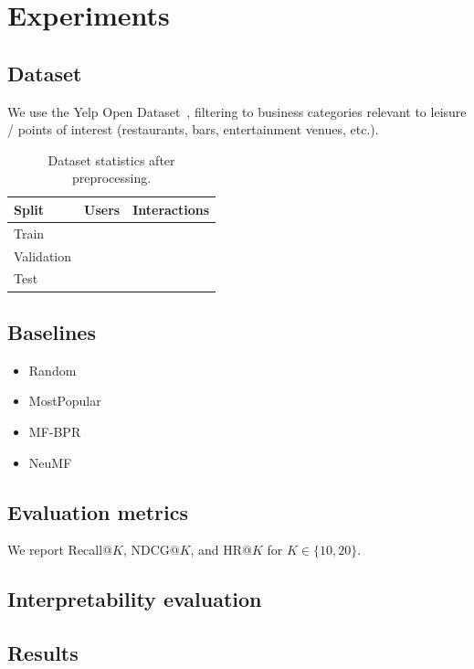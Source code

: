 \chapter{Experiments}
\label{chap:experiments}


\section{Dataset}

We use the Yelp Open Dataset~\cite{yelp2024dataset}, filtering to
business categories relevant to leisure / points of interest
(restaurants, bars, entertainment venues, etc.).

\begin{table}[h]
  \centering
  \caption{Dataset statistics after preprocessing.}
  \label{tab:dataset}
  \begin{tabular}{lrr}
    \toprule
    Split & Users & Interactions \\
    \midrule
    Train & \todo{} & \todo{} \\
    Validation & \todo{} & \todo{} \\
    Test  & \todo{} & \todo{} \\
    \bottomrule
  \end{tabular}
\end{table}

\section{Baselines}

\begin{itemize}
  \item Random
  \item MostPopular
  \item MF-BPR~\cite{koren2009matrix}
  \item NeuMF~\cite{he2017neural}
\end{itemize}

\section{Evaluation metrics}

We report Recall@$K$, NDCG@$K$, and HR@$K$ for $K \in \{10, 20\}$.

\section{Interpretability evaluation}


\section{Results}

